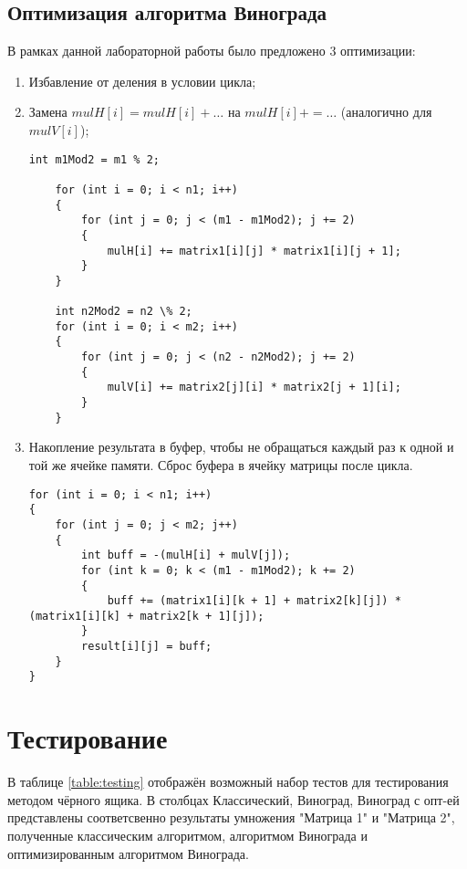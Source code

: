 \documentclass[utf8x, 12pt]{G7-32}
\begin{document}
\subsection{Оптимизация алгоритма Винограда}
В рамках данной лабораторной работы было предложено 3 оптимизации:
\begin{enumerate}
	\item Избавление от деления в условии цикла;
	\item Замена $mulH[i] = mulH[i] + …$ на $mulH[i] += …$ (аналогично для $mulV[i]$);
	
	\begin{lstlisting}[label=some-code,caption=Оптимизации алгоритма Винограда №1 и №2]
	int m1Mod2 = m1 % 2;

	for (int i = 0; i < n1; i++)
	{
		for (int j = 0; j < (m1 - m1Mod2); j += 2)
		{
			mulH[i] += matrix1[i][j] * matrix1[i][j + 1];
		}
	}

	int n2Mod2 = n2 \% 2;
	for (int i = 0; i < m2; i++)
	{
		for (int j = 0; j < (n2 - n2Mod2); j += 2)
		{
			mulV[i] += matrix2[j][i] * matrix2[j + 1][i];
		}
	}
	\end{lstlisting}

	\item Накопление результата в буфер, чтобы не обращаться каждый раз к одной и той же ячейке памяти. Сброс буфера в ячейку матрицы после цикла.
	\begin{lstlisting}[label=some-code,caption=Оптимизации алгоритма Винограда №3]
for (int i = 0; i < n1; i++)
{
	for (int j = 0; j < m2; j++)
	{
		int buff = -(mulH[i] + mulV[j]);
		for (int k = 0; k < (m1 - m1Mod2); k += 2)
		{
			buff += (matrix1[i][k + 1] + matrix2[k][j]) * (matrix1[i][k] + matrix2[k + 1][j]);
		}
		result[i][j] = buff;
	}
}
\end{lstlisting}
\end{enumerate}

\section{Тестирование}
В таблице \ref{table:testing} отображён возможный набор тестов для тестирования методом чёрного ящика.
В столбцах Классический,  Виноград,  Виноград с опт-ей представлены соответсвенно результаты умножения "Матрица 1" и "Матрица 2", полученные классическим алгоритмом, алгоритмом Винограда и оптимизированным алгоритмом Винограда.
\end{document}
